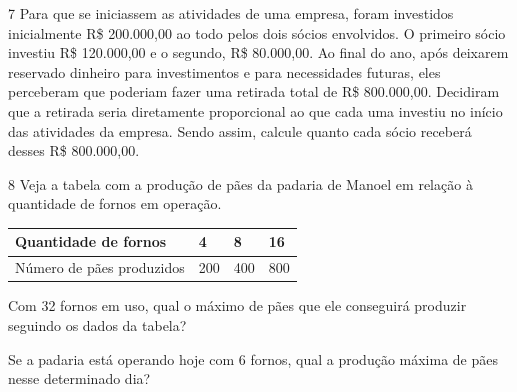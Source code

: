 

\pagebreak
\num{7} Para que se iniciassem as atividades de uma empresa, foram investidos
inicialmente R\$ 200.000,00 ao todo pelos dois sócios envolvidos. O primeiro
sócio investiu R\$ 120.000,00 e o segundo, R\$ 80.000,00. Ao final do ano,
após deixarem reservado dinheiro para investimentos e para necessidades
futuras, eles perceberam que poderiam fazer uma retirada total de R\$ 800.000,00. Decidiram que a retirada seria diretamente proporcional ao que
cada uma investiu no início das atividades da empresa. Sendo assim,
calcule quanto cada sócio receberá desses R\$ 800.000,00.


\num{8} Veja a tabela com a produção de pães da padaria de Manoel em relação à quantidade de fornos em operação.

\begin{center}
\begin{tabular}{l|l|l|l}
\hline
Quantidade de fornos & 4 & 8 & 16 \\ \hline
Número de pães produzidos & 200 & 400 & 800 \\ \hline
\end{tabular}
\end{center}

\begin{escolha}
\item
  Com 32 fornos em uso, qual o máximo de pães que ele conseguirá
  produzir seguindo os dados da tabela?\\

\item
  Se a padaria está operando hoje com 6 fornos, qual a produção máxima
  de pães nesse determinado dia?\\
\end{escolha}

